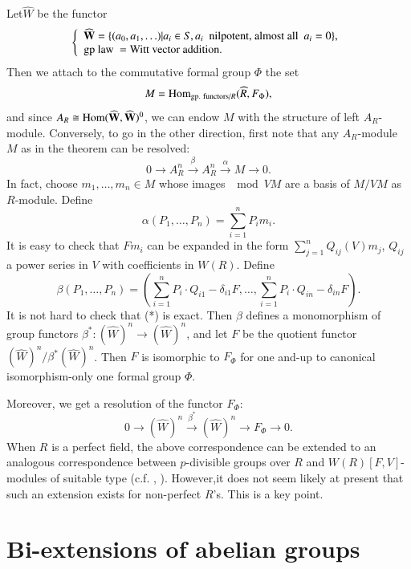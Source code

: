 Let\pageoriginale $\widehat{W}$ be the functor
$$
\left\{
\begin{array}{l}
\widehat{\mathbf{W}}=\{(a_{0},a_{1},\ldots)|a_{i}\in S, a_{i}\text{~ nilpotent, almost all~ } a_{i}=0\},\\
\text{gp law } = \text{Witt vector addition.}
\end{array}\right.
$$
Then we attach to the commutative formal group $\Phi$ the set
$$
M=\operatorname{\mathrm{Hom}}_{\text{gp. functors/}R}(\widehat{R},F_{\Phi}),
$$
and since $A_{R}\cong \operatorname{\mathrm{Hom}} (\widehat{\mathbf{W}},\widehat{\mathbf{W}})^{0}$, we can endow $M$ with the structure of left $A_{R}$-module. Conversely, to go in the other direction, first note that any $A_{R}$-module $M$ as in the theorem can be resolved:
\begin{equation*}
0\to A^{n}_{R}\xrightarrow{\beta}A^{n}_{R}\xrightarrow{\alpha}M\to 0.\tag{*}
\end{equation*}
In fact, choose $m_{1},\ldots,m_{n}\in M$ whose images $\mod VM$ are a basis of $M/VM$ as $R$-module. Define
$$
\alpha(P_{1},\ldots,P_{n})=\sum\limits^{n}_{i=1}P_{i}m_{i}.
$$
It is easy to check that $Fm_{i}$ can be expanded in the form $\sum\limits^{n}_{j=1}Q_{ij}(V)m_{j}$, $Q_{ij}$ a power series in $V$ with coefficients in $W(R)$. Define
$$
\beta(P_{1},\ldots,P_{n})=\left(\sum\limits^{n}_{i=1}P_{i}\cdot Q_{i1}-\delta_{i1}F,\ldots,\sum\limits^{n}_{i=1}P_{i}\cdot Q_{in}-\delta_{in}F\right).
$$
It is not hard to check that (*) is exact. Then $\beta$ defines a monomorphism of group functors $\beta^{*}:(\widehat{W})^{n}\to (\widehat{W})^{n}$, and let $F$ be the quotient functor $(\widehat{W})^{n}/\beta^{*}(\widehat{W})^{n}$. Then $F$ is isomorphic to $F_{\Phi}$ for one and-up to canonical isomorphism-only one formal group $\Phi$.

Moreover, we get a resolution of the functor $F_{\Phi}$:
$$
0\to (\widehat{W})^{n}\xrightarrow{\beta^{*}}(\widehat{W})^{n}\to F_{\Phi}\to 0.
$$
When $R$ is a perfect field, the above correspondence can be extended to an analogous correspondence between $p$-divisible groups over $R$ and $W(R)[F,V]$-modules of suitable type (c.f. \cite{art15-key4}, \cite{art15-key5}). However,\pageoriginale it does not seem likely at present that such an extension exists for non-perfect $R$'s. This is a key point.

\section{Bi-extensions of abelian groups}\label{art15-sec2}

